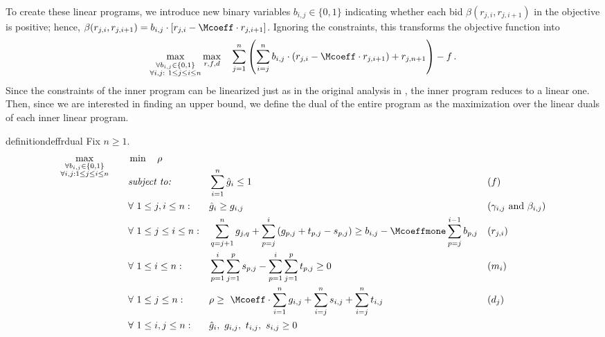 To create these linear programs, we introduce new binary variables $b_{i,j} \in \{0, 1\}$ indicating whether each bid $\beta(r_{j,i}, r_{j,i+1})$ in the objective is positive; hence, $\beta(r_{j,i}, r_{j,i+1})=b_{i,j} \cdot [r_{j,i} - \Mcoeff \cdot r_{j,i+1}] $.
Ignoring the constraints, this transforms the objective function into
\begin{equation*}
    \max_{\substack{\\ \forall b_{i,j}\in\{0,1\} \\ \forall i,j:\  1\leq j\leq i \leq n}} \max_{r,f,d} \quad 
            \sum_{j=1}^{n} \left(\sum_{i=j}^{n} b_{i,j} \cdot (r_{j,i} -\Mcoeff \cdot r_{j,i+1})  + r_{j,n+1}\right) - f\,.
\end{equation*}
Since the constraints of the inner program can be linearized just as in the original analysis in \cite{JMS02,JainMMSV03}, the inner program reduces to a linear one. Then, since we are interested in finding an upper bound, we define the dual of the entire program as the maximization over the linear duals of each inner linear program.
\begin{restatable}{definition}{deffrdual}
\label{def:frdual}
    Fix $n\geq 1$.
    \begin{align*}
    \smash{\max_{\substack{\forall b_{i,j}\in\{0,1\} \\ \forall i,j: 1\leq j\leq i \leq n}}}\qquad 
    & \min \quad \rho \\
    &\begin{aligned}
        &\text{\emph{subject to:}} 
        &&  \sum_{i=1}^{n} \hat{g}_i \leq 1 && \text{($f$)} \\
        & \forall \ 1 \le j, i \le n: 
        && \hat{g}_i \geq g_{i,j} && \text{($\gamma_{i,j}$ and $\beta_{i,j}$)}\\
        & \forall \ 1\le j \le i \le n: 
        && \sum_{q=j+1}^n g_{j,q} + \sum_{p = j}^{i} \left(g_{p,j} + t_{p,j} - s_{p,j}\right) \geq b_{i,j} - \Mcoeffmone \sum_{p=j}^{i-1} b_{p,j}
        && \text{($r_{j,i}$)}\\
        & \forall \ 1\leq i \leq n: 
        &&\sum_{p=1}^i \sum_{j=1}^p s_{p,j} - \sum_{p=1}^i \sum_{j=1}^p t_{p,j} \ge 0 && \text{($m_i$)}\\
        & \forall \ 1\leq j\leq n:
        && \rho \geq \ \Mcoeff\cdot \sum_{i=1}^n g_{i,j} + \sum_{i=j}^n s_{i,j} + \sum_{i=j}^n t_{i,j} && \text{($d_j$)} \\
        & \forall \ 1 \le i,j \le n: && \hat{g}_{i}, \ g_{i,j}, \ t_{i,j}, \ s_{i,j} \geq 0
    \end{aligned}
    \end{align*}
\end{restatable}

